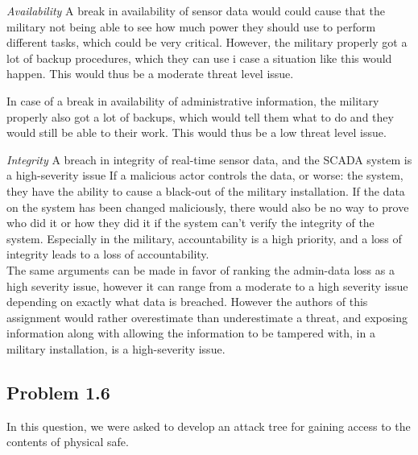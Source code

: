 \documentclass{article}
\begin{document}
\emph{Availability}
A break in availability of sensor data would could cause that the military not being 
able to see how much power they should use to perform different tasks, which could be 
very critical. However, the military properly got a lot of backup procedures, which 
they can use i case a situation like this would happen. This would thus be a moderate 
threat level issue. 

In case of a break in availability of administrative information, the military properly 
also got a lot of backups, which would tell them what to do and they would still be able 
to their work. This would thus be a low threat level issue.  


\emph{Integrity}
A breach in integrity of real-time sensor data, and the SCADA system is a high-severity issue
If a malicious actor controls the data, or worse: the system, they have the ability to cause
a black-out of the military installation. If the data on the system has been changed 
maliciously, there would also be no way to prove who did it or how they did it if the system
can't verify the integrity of the system. Especially in the military, accountability is a
high priority, and a loss of integrity leads to a loss of accountability.\\

The same arguments can be made in favor of ranking the admin-data loss as a high severity
issue, however it can range from a moderate to a high severity issue depending on exactly
what data is breached. However the authors of this assignment would rather overestimate than
underestimate a threat, and exposing information along with allowing the information to be
tampered with, in a military installation, is a high-severity issue.

\subsection{Problem 1.6}
In this question, we were asked to develop an attack tree for gaining access to the contents of physical safe. 
\\
\end{document}

